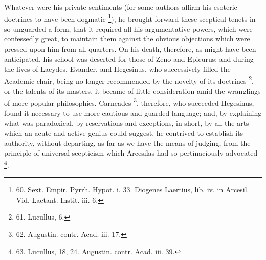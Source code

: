 Whatever were his private
sentiments (for some authors affirm his esoteric doctrines to have
been dogmatic \footnote{60. Sext. Empir. Pyrrh. Hypot.
i. 33. Diogenes Laertius, lib. iv. in Arcesil. Vid. Lactant. Instit.
iii. 6.}), he
brought forward these sceptical tenets in so unguarded a form, that it
required all his argumentative powers, which were confessedly great,
to maintain them against the obvious objections which were pressed
upon him from all quarters. On his death, therefore, as might have
been anticipated, his school was deserted for those of Zeno and
Epicurus; and during the lives of Lacydes, Evander, and Hegesinus, who
successively filled the Academic chair, being no longer recommended by
the novelty of its doctrines \footnote{61.
Lucullus, 6.}, or the talents of its masters, it became of little
consideration amid the wranglings of more popular philosophies.
Carneades \footnote{62. Augustin. contr. Acad.
iii. 17.}, therefore,
who succeeded Hegesinus, found it necessary to use more cautious and
guarded language; and, by explaining what was paradoxical, by
reservations and exceptions, in short, by all the arts which an acute
and active genius could suggest, he contrived to establish its
authority, without departing, as far as we have the means of judging,
from the principle of universal scepticism which Arcesilas had so
pertinaciously advocated \footnote{63. Lucullus, 18, 24. Augustin.
contr. Acad. iii. 39.}.


